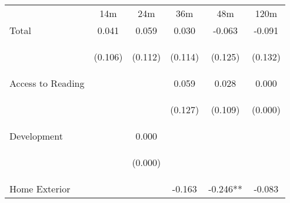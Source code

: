 \begin{tabular}{lccccc}
\hline \noalign{\smallskip} & 14m & 24m & 36m & 48m & 120m\\
\noalign{\smallskip}\hline \noalign{\smallskip}Total & 0.041 & 0.059 & 0.030 & -0.063 & -0.091\\
 & \begin{footnotesize}(0.106)\end{footnotesize} & \begin{footnotesize}(0.112)\end{footnotesize} & \begin{footnotesize}(0.114)\end{footnotesize} & \begin{footnotesize}(0.125)\end{footnotesize} & \begin{footnotesize}(0.132)\end{footnotesize}\\
\noalign{\smallskip}Access to Reading &  &  & 0.059 & 0.028 & 0.000\\
 & \begin{footnotesize}\end{footnotesize} & \begin{footnotesize}\end{footnotesize} & \begin{footnotesize}(0.127)\end{footnotesize} & \begin{footnotesize}(0.109)\end{footnotesize} & \begin{footnotesize}(0.000)\end{footnotesize}\\
\noalign{\smallskip}Development &  & 0.000 &  &  & \\
 & \begin{footnotesize}\end{footnotesize} & \begin{footnotesize}(0.000)\end{footnotesize} & \begin{footnotesize}\end{footnotesize} & \begin{footnotesize}\end{footnotesize} & \begin{footnotesize}\end{footnotesize}\\
\noalign{\smallskip}Home Exterior &  &  & -0.163 & -0.246** & -0.083\\

\end{tabular}
